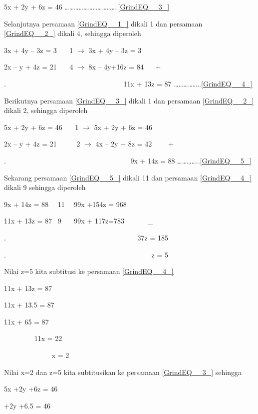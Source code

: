 \documentclass[11pt,fleqn]{book} %
\begin{document}
\noindent 5x + 2y + 6z = 46 {\dots}{\dots}{\dots}{\dots}{\dots}{\dots}{\dots}{\dots}{\dots}{\dots}{\dots}.\eqref{GrindEQ__3_}

\noindent Selanjutnya persamaan \eqref{GrindEQ__1_} dikali 1 dan persamaan \eqref{GrindEQ__2_} dikali 4, sehingga diperoleh

\noindent 3x + 4y -- 3z = 3~~~ {\textbar}1{\textbar} $\mathrm{\to}$ 3x + 4y -- 3z = 3

\noindent 2x -- y + 4z = 21~~~ {\textbar}4{\textbar} $\mathrm{\to}$ 8x -- 4y+16z = 84 ~~ +

\noindent .~~~~~~~~~~~~~~~~~~~~~~~~~~~~~~~~~ 11x + 13z = 87 {\dots}{\dots}{\dots}{\dots}{\dots}..\eqref{GrindEQ__4_}

\noindent Berikutnya persamaan \eqref{GrindEQ__3_} dikali 1 dan persamaan \eqref{GrindEQ__2_} dikali 2, sehingga diperoleh

\noindent 5x + 2y + 6z = 46~~~ {\textbar}1{\textbar} $\mathrm{\to}$ 5x + 2y + 6z = 46

\noindent 2x -- y + 4z = 21~~~~~ {\textbar}2{\textbar} $\mathrm{\to}$ 4x -- 2y + 8z = 42~~~~ +

\noindent .~~~~~~~~~~~~~~~~~~~~~~~~~~~~~~~~~~~ 9x + 14z = 88 {\dots}{\dots}{\dots}{\dots}..\eqref{GrindEQ__5_}

\noindent Sekarang persamaan \eqref{GrindEQ__5_} dikali 11 dan persamaan \eqref{GrindEQ__4_} dikali 9 sehingga diperoleh

\noindent 9x + 14z = 88~~ {\textbar}11{\textbar}~~ 99x +154z = 968

\noindent 11x + 13z = 87~ {\textbar}9{\textbar}~~~ 99x + 117z=783~~~~~~ \_

\noindent .~~~~~~~~~~~~~~~~~~~~~~~~~~~~~~~~~~~~~ 37z = 185

\noindent .~~~~~~~~~~~~~~~~~~~~~~~~~~~~~~~~~~~~~~~~~ z = 5

\noindent Nilai z=5 kita subtitusi ke persamaan \eqref{GrindEQ__4_}

\noindent 11x + 13z = 87

\noindent 11x + 13.5 = 87

\noindent 11x + 65 = 87

\noindent ~~~~~~~~ 11x = 22

\noindent ~~~~~~~~~~~~~ x = 2

\noindent Nilai x=2 dan z=5 kita subtitusikan ke persamaan \eqref{GrindEQ__3_} sehingga

\noindent 5x +2y +6z = 46

 +2y +6.5 = 46
\end{document}
